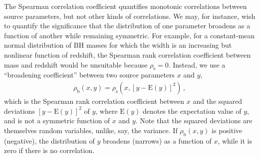 \documentclass[%
reprint,
 amsmath,amssymb,
 aps,
 prd,nofootinbib,nobibnotes,
 superscriptaddress,groupedaddress,
]{revtex4-2}
\begin{document}
The Spearman correlation coefficient quantifies monotonic correlations between source parameters, but not other kinds of correlations. We may, for instance, wish to quantify the significance that the distribution of one parameter broadens as a function of another while remaining symmetric. For example, for a constant-mean normal distribution of BH masses for which the width is an increasing but nonlinear function of redshift, the Spearman rank correlation coefficient between mass and redshift would be unsuitable because $\rho_\mathrm{s}=0$. Instead, we use a ``broadening coefficient'' between two source parameters $x$ and $y$,
\begin{align}
\rho_\mathrm{b}(x,y)
=
\rho_\mathrm{s} \left( x , [ y - \mathrm{E}(y) ]^2 \right)
\, ,
\label{eq: broadening}
\end{align}
which is the Spearman rank correlation coefficient between $x$ and the squared deviations $[y-\mathrm{E}(y)]^2$ of $y$, where $\mathrm{E}(y)$ denotes the expectation value of $y$, and is not a symmetric function of $x$ and $y$. Note that the squared deviations are themselves random variables, unlike, say, the variance. If $\rho_\mathrm{b}(x,y)$ is positive (negative), the distribution of $y$ broadens (narrows) as a function of $x$, while it is zero if there is no correlation.
\end{document}
